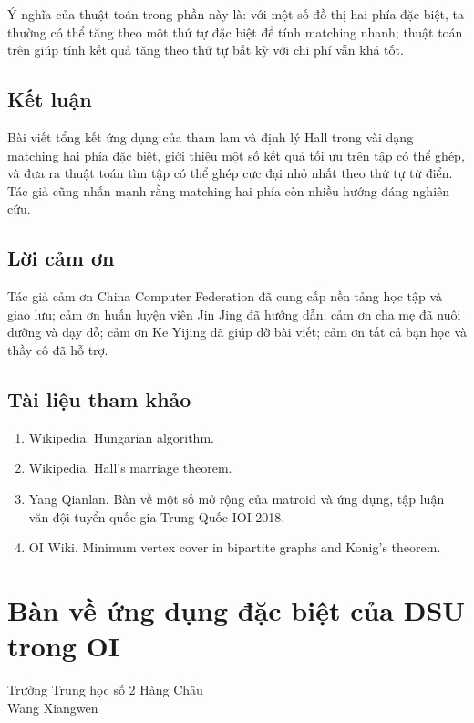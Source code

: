 \documentclass[11pt]{article}
\begin{document}
Ý nghĩa của thuật toán trong phần này là: với một số đồ thị hai phía đặc biệt,
ta thường có thể tăng theo một thứ tự đặc biệt để tính matching nhanh; thuật
toán trên giúp tính kết quả tăng theo thứ tự bất kỳ với chi phí vẫn khá tốt.

\subsection{Kết luận}

Bài viết tổng kết ứng dụng của tham lam và định lý Hall trong vài dạng matching
hai phía đặc biệt, giới thiệu một số kết quả tối ưu trên tập có thể ghép, và
đưa ra thuật toán tìm tập có thể ghép cực đại nhỏ nhất theo thứ tự từ điển. Tác
giả cũng nhấn mạnh rằng matching hai phía còn nhiều hướng đáng nghiên cứu.

\subsection{Lời cảm ơn}

Tác giả cảm ơn China Computer Federation đã cung cấp nền tảng học tập và giao
lưu; cảm ơn huấn luyện viên Jin Jing đã hướng dẫn; cảm ơn cha mẹ đã nuôi dưỡng
và dạy dỗ; cảm ơn Ke Yijing đã giúp đỡ bài viết; cảm ơn tất cả bạn học và thầy
cô đã hỗ trợ.

\subsection{Tài liệu tham khảo}

\begin{enumerate}
  \item Wikipedia. Hungarian algorithm.
  \item Wikipedia. Hall's marriage theorem.
  \item Yang Qianlan. Bàn về một số mở rộng của matroid và ứng dụng, tập luận
  văn đội tuyển quốc gia Trung Quốc IOI 2018.
  \item OI Wiki. Minimum vertex cover in bipartite graphs and Konig's theorem.
\end{enumerate}

\section{Bàn về ứng dụng đặc biệt của DSU trong OI}

\begin{center}
Trường Trung học số 2 Hàng Châu\\
Wang Xiangwen
\end{center}
\end{document}
